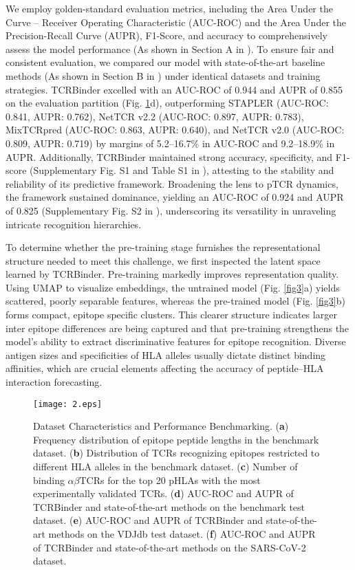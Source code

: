 \documentclass[10pt,letterpaper]{article}
\begin{document}
We employ golden-standard evaluation metrics, including the Area Under the Curve – Receiver Operating Characteristic (AUC-ROC) and the Area Under the Precision-Recall Curve (AUPR), F1-Score, and accuracy to comprehensively assess the model performance (As shown in Section A in ). To ensure fair and consistent evaluation, we compared our model with state-of-the-art baseline methods (As shown in Section B in ) under identical datasets and training strategies. TCRBinder excelled with an AUC-ROC of 0.944 and AUPR of 0.855 on the evaluation partition (Fig. \ref{fig2}d), outperforming STAPLER (AUC-ROC: 0.841, AUPR: 0.762), NetTCR v2.2 (AUC-ROC: 0.897, AUPR: 0.783), MixTCRpred (AUC-ROC: 0.863, AUPR: 0.640), and NetTCR v2.0 (AUC-ROC: 0.809, AUPR: 0.719) by margins of 5.2–16.7\% in AUC-ROC and 9.2–18.9\% in AUPR. Additionally, TCRBinder maintained strong accuracy, specificity, and F1-score (Supplementary Fig. S1 and Table S1 in ), attesting to the stability and reliability of its predictive framework. Broadening the lens to pTCR dynamics, the framework sustained dominance, yielding an AUC-ROC of 0.924 and AUPR of 0.825 (Supplementary Fig. S2 in ), underscoring its versatility in unraveling intricate recognition hierarchies. 

To determine whether the pre-training stage furnishes the representational structure needed to meet this challenge, we first inspected the latent space learned by TCRBinder. Pre-training markedly improves representation quality. Using UMAP to visualize embeddings, the untrained model (Fig. \ref{fig3}a) yields scattered, poorly separable features, whereas the pre-trained model (Fig. \ref{fig3}b) forms compact, epitope specific clusters. This clearer structure indicates larger inter epitope differences are being captured and that pre-training strengthens the model’s ability to extract discriminative features for epitope recognition. Diverse antigen sizes and specificities of HLA alleles usually dictate distinct binding affinities, which are crucial elements affecting the accuracy of peptide–HLA interaction forecasting. 

\begin{figure}[!h]
    \texttt{[image: 2.eps]}
    \caption{Dataset Characteristics and Performance Benchmarking. (\textbf{a}) Frequency distribution of epitope peptide lengths in the benchmark dataset. (\textbf{b}) Distribution of TCRs recognizing epitopes restricted to different HLA alleles in the benchmark dataset. (\textbf{c}) Number of binding $\alpha$$\beta$TCRs for the top 20 pHLAs with the most experimentally validated TCRs. (\textbf{d}) AUC-ROC and AUPR of TCRBinder and state-of-the-art methods on the benchmark test dataset. (\textbf{e}) AUC-ROC and AUPR of TCRBinder and state-of-the-art methods on the VDJdb test dataset. (\textbf{f}) AUC-ROC and AUPR of TCRBinder and state-of-the-art methods on the SARS-CoV-2 dataset.}
\label{fig2}
\end{figure}
\end{document}
